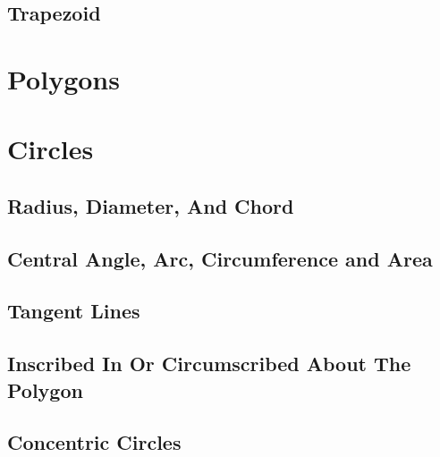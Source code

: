 \documentclass[
	11pt, %
	handout,
]{beamer}
\begin{document}

\subsection{Trapezoid}



\section{Polygons}



\section{Circles}


\subsection{Radius, Diameter, And Chord}


\subsection{Central Angle, Arc, Circumference and Area}


\subsection{Tangent Lines}


\subsection{Inscribed In Or Circumscribed About The Polygon}


\subsection{Concentric Circles}
\end{document}
